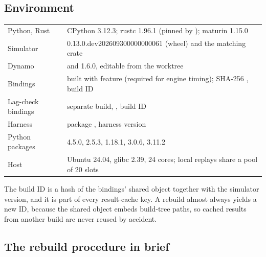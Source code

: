\subsection{Environment}

\begin{center}\footnotesize
\begin{tabularx}{\linewidth}{@{}lY@{}}
  \toprule
  Python, Rust & CPython 3.12.3; rustc 1.96.1 (pinned by ); maturin 1.15.0 \\
  Simulator &  0.13.0.dev202609300000000061 (wheel) and the matching
     crate \\
  Dynamo &  and  1.6.0, editable from the worktree \\
  Bindings & built with feature  (required for \ais{} engine timing);
     SHA-256 , build ID  \\
  Lag-check bindings & separate build,  , build ID  \\
  Harness & package , harness version  \\
  Python packages &  4.5.0,  2.5.3,  1.18.1,  3.0.6,
     3.11.2 \\
  Host & Ubuntu 24.04, glibc 2.39, 24 cores; local replays share a pool of 20 slots \\
  \bottomrule
\end{tabularx}
\end{center}

The build ID is a hash of the bindings' shared object together with the simulator version, and
it is part of every result-cache key. A rebuild almost always yields a new ID, because the shared
object embeds build-tree paths, so cached results from another build are never reused by accident.

\subsection{The rebuild procedure in brief}

